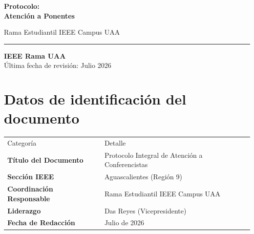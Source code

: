 \documentclass[11pt,a4paper]{article}
\begin{document}
\color{textBrown}

\pagestyle{empty}

\vspace{1.5cm}
\logos
\vspace{3cm}

{\fontsize{36}{42}\selectfont\bfseries\color{titleBrown} Protocolo:\\ Atención a Ponentes}

\vspace{0.8cm}

{\large Rama Estudiantil IEEE Campus UAA}

\vspace{0.3cm}

\noindent\rule{7.5cm}{0.5pt}

\vfill

{\color{sectionTeal}\bfseries IEEE Rama UAA}\\[0.2cm]
Última fecha de revisión: Julio 2026\\[0.1cm]

\newpage

\pagestyle{fancy}
\fancyhf{}
\renewcommand{\headrulewidth}{0pt}
\fancyfoot[C]{\thepage}

\vspace{0.5cm}

\section{Datos de identificación del documento}

\vspace{0.8cm}


\begin{center}
\begin{tabular}{@{}p{4.5cm} p{8cm}@{}}
    \small Categoría & \small Detalle \\[0.5cm]
    
    \textbf{Título del Documento} & Protocolo Integral de Atención a Conferencistas \\[0.5cm]
    
    \textbf{Sección IEEE} & Aguascalientes (Región 9) \\[0.5cm]
    
    \textbf{Coordinación Responsable} & Rama Estudiantil IEEE Campus UAA \\[0.5cm]
    
    \textbf{Liderazgo} & Das Reyes (Vicepresidente) \\[0.5cm]
    
    \textbf{Fecha de Redacción} & Julio de 2026 \\[0.5cm]
    
\end{tabular}
\end{center}
\end{document}
